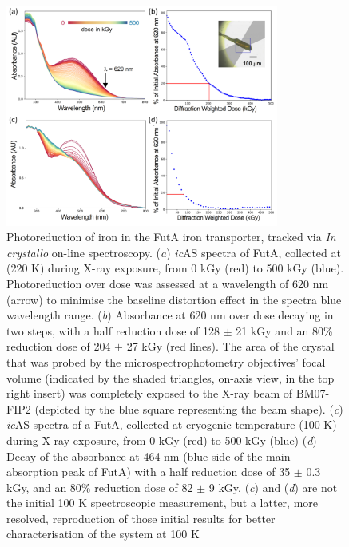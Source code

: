 \begin{figure}[H] %
\begin{center}
\noindent \includegraphics[width=0.8\textwidth]{images/Spectroscopy/FutA_ic_spectro_CT-vs-RT.pdf}
\end{center}
\caption{Photoreduction of iron in the FutA iron transporter, tracked via \textit{In crystallo} on-line spectroscopy. (\textit{a}) \textit{ic}AS spectra of FutA, collected at (220 K) during X-ray exposure, from 0 kGy (red) to 500 kGy (blue). Photoreduction over dose was assessed at a wavelength of 620 nm (arrow) to minimise the baseline distortion effect in the spectra blue wavelength range. (\textit{b}) Absorbance at 620 nm over dose decaying in two steps, with a half reduction dose of 128 \(\pm\) 21 kGy and an 80\% reduction dose of 204 \(\pm\) 27 kGy (red lines). The area of the crystal that was probed by the microspectrophotometry objectives' focal volume (indicated by the shaded triangles, on-axis view, in the top right insert) was completely exposed to the X-ray beam of BM07-FIP2 (depicted by the blue square representing the beam shape). (\textit{c}) \textit{ic}AS spectra of a FutA, collected at cryogenic temperature (100 K)  during X-ray exposure, from 0 kGy (red) to 500 kGy (blue) (\textit{d}) Decay of the absorbance at 464 nm (blue side of the main absorption peak of FutA) with a half reduction dose of 35 \(\pm\) 0.3 kGy, and an 80\% reduction dose of 82 \(\pm\) 9 kGy. (\textit{c}) and (\textit{d}) are not the initial 100 K spectroscopic measurement, but a latter, more resolved, reproduction of those initial results for better characterisation of the system at 100 K}
\label{fig:FutA_CT_RT}
\end{figure}

